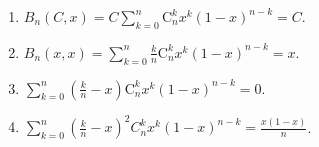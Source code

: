 \documentclass[../../main.tex]{subfiles}%
\begin{document}
\begin{lemma}\label{lemma:一些常见函数的Bernstein多项式}
\begin{enumerate}
\item $B_n(C,x)=C\sum_{k=0}^n{\mathrm{C}_{n}^{k}x^k\left( 1-x \right) ^{n-k}}=C.$

\item $B_n(x,x)=\sum_{k=0}^n{\frac{k}{n}\mathrm{C}_{n}^{k}x^k\left( 1-x \right) ^{n-k}}=x.$

\item $\sum_{k=0}^n{\left( \frac{k}{n}-x \right) \mathrm{C}_{n}^{k}x^k\left( 1-x \right) ^{n-k}}=0.$

\item $\sum_{k=0}^n{\left( \frac{k}{n}-x \right) ^2C_{n}^{k}x^k\left( 1-x \right) ^{n-k}}=\frac{x(1-x)}{n}$.
\end{enumerate}
\end{lemma}
\end{document}
